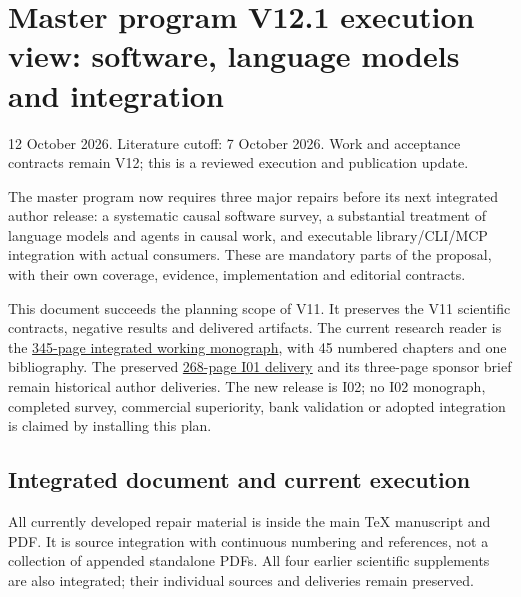 \documentclass[
  11pt,
  a4paper,
]{article}
\author{}
\date{}
\begin{document}
\hypertarget{master-program-v12.1-execution-view-software-language-models-and-integration}{%
\section{Master program V12.1 execution view: software, language models
and
integration}\label{master-program-v12.1-execution-view-software-language-models-and-integration}}

12 October 2026. Literature cutoff: 7 October 2026. Work and acceptance
contracts remain V12; this is a reviewed execution and publication
update.

The master program now requires three major repairs before its next
integrated author release: a systematic causal software survey, a
substantial treatment of language models and agents in causal work, and
executable library/CLI/MCP integration with actual consumers. These are
mandatory parts of the proposal, with their own coverage, evidence,
implementation and editorial contracts.

This document succeeds the planning scope of V11. It preserves the V11
scientific contracts, negative results and delivered artifacts. The
current research reader is the
\href{../causal_integrated_working_2026-10-12.pdf}{345-page integrated
working monograph}, with 45 numbered chapters and one bibliography. The
preserved
\href{../causal_master_execution_reader_2026-10-11.pdf}{268-page I01
delivery} and its three-page sponsor brief remain historical author
deliveries. The new release is I02; no I02 monograph, completed survey,
commercial superiority, bank validation or adopted integration is
claimed by installing this plan.

\hypertarget{integrated-document-and-current-execution}{%
\subsection{Integrated document and current
execution}\label{integrated-document-and-current-execution}}

All currently developed repair material is inside the main TeX
manuscript and PDF. It is source integration with continuous numbering
and references, not a collection of appended standalone PDFs. All four
earlier scientific supplements are also integrated; their individual
sources and deliveries remain preserved.
\end{document}
